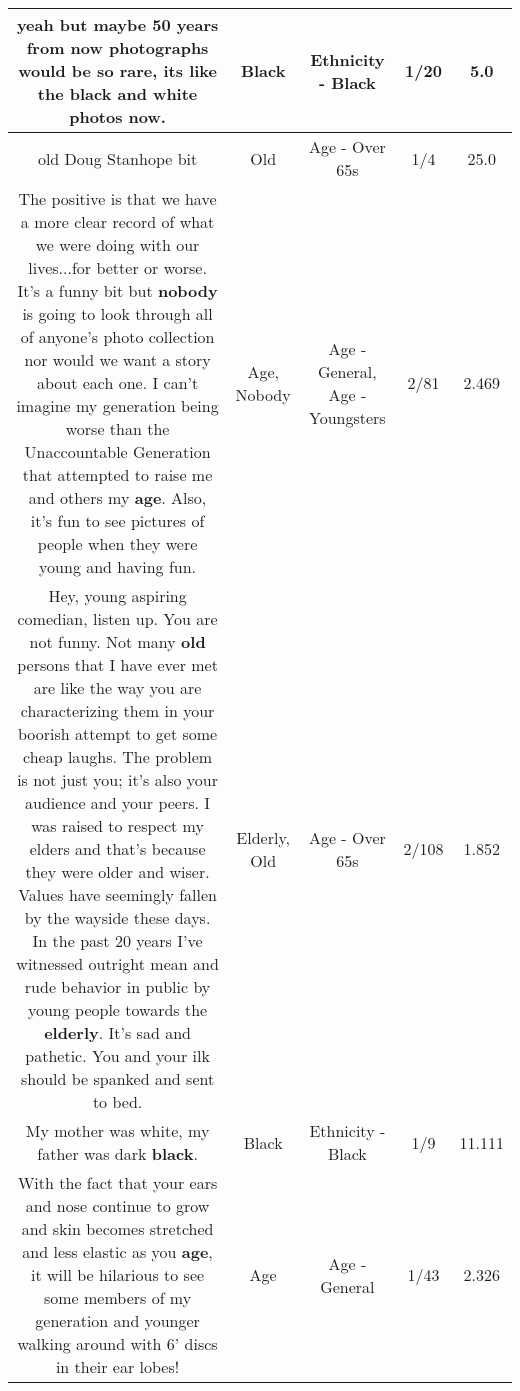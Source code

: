 \documentclass[11pt]{article}
\newlength\mylength
\begin{document}
\begin{center}
\begin{longtable}{|C{.65\mylength}|C{.30\mylength}|C{.12\mylength}|C{.12\mylength}|C{.12\mylength}|}
  \small yeah but maybe 50 years from now photographs would be so rare, its like the \textbf{black} and white photos now.\normalsize   & Black & Ethnicity - Black & 1/20 & 5.0 \\  \hline
  \small old Doug Stanhope bit\normalsize   & Old & Age - Over 65s & 1/4 & 25.0 \\  \hline
  \small The positive is that we have a more clear record of what we were doing with our lives...for better or worse.  It's a funny bit but \textbf{nobody} is going to look through all of anyone's photo collection nor would we want a story about each one.  I can't imagine my generation being worse than the Unaccountable Generation that attempted to raise me and others my \textbf{age}.  Also, it's fun to see pictures of people when they were young and having fun.\normalsize   & Age, Nobody & Age - General, Age - Youngsters & 2/81 & 2.469 \\  \hline
  \small Hey, young aspiring comedian, listen up. You are not funny. Not many \textbf{old} persons that I have ever met are like the way you are characterizing them in your boorish attempt to get some cheap laughs. The problem is not just you; it's also your audience and your peers. I was raised to respect my elders and that's because they were older and wiser. Values have seemingly fallen by the wayside these days. In the past 20 years I've witnessed outright mean and rude behavior in public by young people towards the \textbf{elderly}. It's sad and pathetic. You and your ilk should be spanked and sent to bed.\normalsize   & Elderly, Old & Age - Over 65s & 2/108 & 1.852 \\  \hline
  \small My mother was white, my father was dark \textbf{black}.\normalsize   & Black & Ethnicity - Black & 1/9 & 11.111 \\  \hline
  \small With the fact that your ears and nose continue to grow and skin becomes stretched and less elastic as you \textbf{age}, it will be hilarious to see some members of my generation and younger walking around with 6' discs in their ear lobes!\normalsize   & Age & Age - General & 1/43 & 2.326 \\  \hline

\end{longtable}
\end{center}
\end{document}

